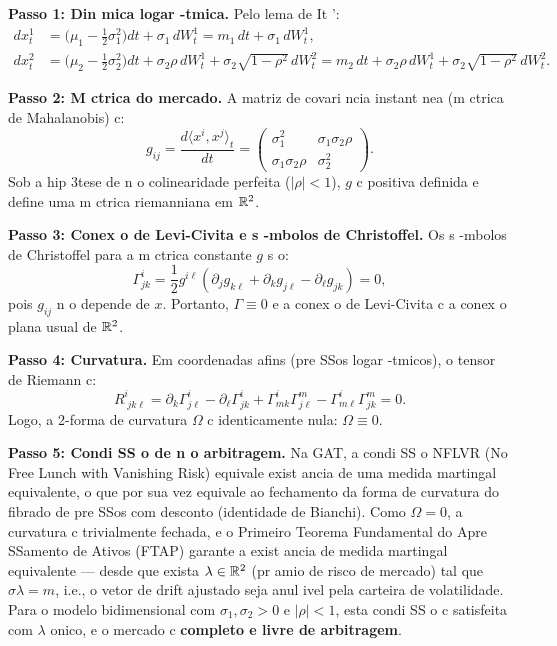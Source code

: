 \begin{sol}
\textbf{Passo 1: Din mica logar -tmica.} Pelo lema de It ':
\begin{align*}
 dx^1_t &= \bigl(\mu_1 - \tfrac{1}{2}\sigma_1^2\bigr)dt + \sigma_1\,dW^1_t = m_1\,dt + \sigma_1\,dW^1_t,\\
 dx^2_t &= \bigl(\mu_2 - \tfrac{1}{2}\sigma_2^2\bigr)dt + \sigma_2\rho\,dW^1_t + \sigma_2\sqrt{1-\rho^2}\,dW^2_t = m_2\,dt + \sigma_2\rho\,dW^1_t + \sigma_2\sqrt{1-\rho^2}\,dW^2_t.
\end{align*}

\textbf{Passo 2: M ctrica do mercado.} A matriz de covari ncia instant nea (m ctrica de Mahalanobis) c:
\begin{equation}
 g_{ij} = \frac{d\langle x^i, x^j\rangle_t}{dt}
 = \begin{pmatrix}
 \sigma_1^2 & \sigma_1\sigma_2\rho \\
 \sigma_1\sigma_2\rho & \sigma_2^2
 \end{pmatrix}.
\end{equation}
Sob a hip 3tese de n o colinearidade perfeita ($|\rho|<1$), $g$ c positiva definida e define uma m ctrica riemanniana em $\mathbb{R}^2$.

\textbf{Passo 3: Conex o de Levi-Civita e s -mbolos de Christoffel.} Os s -mbolos de Christoffel para a m ctrica constante $g$ s o:
\begin{equation}
 \Gamma^i_{jk} = \frac{1}{2}g^{i\ell}(\partial_j g_{k\ell} + \partial_k g_{j\ell} - \partial_\ell g_{jk}) = 0,
\end{equation}
pois $g_{ij}$ n o depende de $x$. Portanto, $\Gamma\equiv 0$ e a conex o de Levi-Civita c a conex o plana usual de $\mathbb{R}^2$.

\textbf{Passo 4: Curvatura.} Em coordenadas afins (pre SSos logar -tmicos), o tensor de Riemann c:
\begin{equation}
 R^i_{\;jk\ell} = \partial_k\Gamma^i_{j\ell} - \partial_\ell\Gamma^i_{jk} + \Gamma^i_{mk}\Gamma^m_{j\ell} - \Gamma^i_{m\ell}\Gamma^m_{jk} = 0.
\end{equation}
Logo, a 2-forma de curvatura $\Omega$ c identicamente nula: $\Omega \equiv 0$.

\textbf{Passo 5: Condi SS o de n o arbitragem.} Na GAT, a condi SS o NFLVR (No Free Lunch with Vanishing Risk) equivale exist ancia de uma medida martingal equivalente, o que por sua vez equivale ao fechamento da forma de curvatura do fibrado de pre SSos com desconto (identidade de Bianchi). Como $\Omega=0$, a curvatura c trivialmente fechada, e o Primeiro Teorema Fundamental do Apre SSamento de Ativos (FTAP) garante a exist ancia de medida martingal equivalente --- desde que exista $\lambda\in\mathbb{R}^2$ (pr amio de risco de mercado) tal que $\sigma\lambda = m$, i.e., o vetor de drift ajustado seja anul ivel pela carteira de volatilidade. Para o modelo bidimensional com $\sigma_1,\sigma_2>0$ e $|\rho|<1$, esta condi SS o c satisfeita com $\lambda$ onico, e o mercado c \textbf{completo e livre de arbitragem}.
\end{sol}

